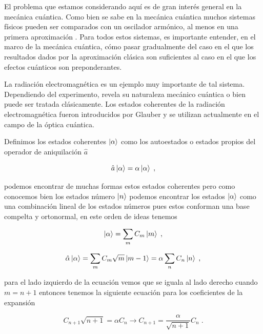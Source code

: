             El problema que estamos considerando aquí es de gran interés general en la mecánica cuántica. Como bien se sabe en la mecánica cuántica muchos sistemas físicos pueden ser comparados con un oscilador armónico, al menos en una primera aproximación \cite{cohen1986quantum}. Para todos estos sistemas, es importante entender, en el marco de la mecánica cuántica, cómo pasar gradualmente del caso en el que los resultados dados por la aproximación clásica son suficientes al caso en el que los efectos cuánticos son preponderantes.

            La radiación electromagnética es un ejemplo muy importante de tal sistema. Dependiendo del experimento, revela su naturaleza mecánico cuántica o bien puede ser tratada clásicamente. Los estados coherentes de la radiación electromagnética fueron introducidos por Glauber y se utilizan actualmente en el campo de la óptica cuántica.

            Definimos los estados coherentes $\ket{\alpha}$ como los autoestados o estados propios del operador de aniquilación $\hat{a}$

            \begin{equation}
                \hat{a}\ket{\alpha} = \alpha\ket{\alpha}\;,
            \end{equation}

            podemos encontrar de muchas formas estos estados coherentes pero como conocemos bien los estados número $\ket{n}$ podemos encontrar los estados $\ket{\alpha}$ como una combinación lineal de los estados números pues estos conforman una base compelta y ortonormal, en este orden de ideas tenemos

            \begin{equation}
                \ket{\alpha} = \sum_m C_m \ket{m}\;,
            \end{equation}

            \begin{equation}
                \hat{\alpha}\ket{\alpha} = \sum_m C_m \sqrt{m}\ket{m-1} = \alpha \sum_n C_n \ket{n}\;,
            \end{equation}

            para el lado izquierdo de la ecuación vemos que se iguala al lado derecho cuando $m = n +1$ entonces tenemos la siguiente ecuación para los coeficientes de la expansión 
            
            \begin{equation}\label{eq:coefcnmahuno}
                C_{n+1}\sqrt{n + 1} = \alpha C_n \rightarrow C_{n+1} = \frac{\alpha}{\sqrt{n + 1}}C_n \;.
            \end{equation}

